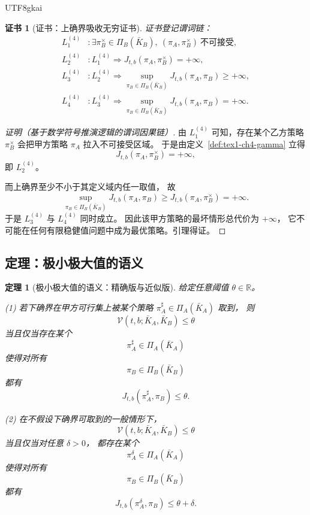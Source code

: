 \documentclass[12pt]{article}
\newtheorem{theorem}{定理}[section]
\newtheorem{Certificate}{证书}[section]
\newcommand{\RR}{\mathbb{R}}
\begin{document}
\begin{CJK*}{UTF8}{gkai}
\begin{Certificate}[证书：上确界吸收无穷证书]
\label{cert:tex1-ch4-infty-penalty}
证书登记谓词链：
\[
\begin{aligned}
  L^{(4)}_1 &: \exists \pi_B^\times\in\Pi_B(\bar K_B),\ (\pi_A,\pi_B^\times)\ \text{不可接受},\\
  L^{(4)}_2 &: L^{(4)}_1\Rightarrow J_{t,b}(\pi_A,\pi_B^\times)=+\infty,\\
  L^{(4)}_3 &: L^{(4)}_2\Rightarrow
              \sup_{\pi_B\in\Pi_B(\bar K_B)}J_{t,b}(\pi_A,\pi_B)\ge +\infty,\\
  L^{(4)}_4 &: L^{(4)}_3\Rightarrow
              \sup_{\pi_B\in\Pi_B(\bar K_B)}J_{t,b}(\pi_A,\pi_B)=+\infty.
\end{aligned}
\]
\end{Certificate}

\begin{proof}[证明（基于数学符号推演逻辑的谓词因果链）]
由 \(L^{(4)}_1\) 可知，存在某个乙方策略 \(\pi_B^\times\)
会把甲方策略 \(\pi_A\) 拉入不可接受区域。
于是由定义~\ref{def:tex1-ch4-gamma} 立得
\[
  J_{t,b}(\pi_A,\pi_B^\times)=+\infty,
\]
即 \(L^{(4)}_2\)。

而上确界至少不小于其定义域内任一取值，
故
\[
  \sup_{\pi_B\in\Pi_B(\bar K_B)}J_{t,b}(\pi_A,\pi_B)
  \ge
  J_{t,b}(\pi_A,\pi_B^\times)
  =
  +\infty.
\]
于是 \(L^{(4)}_3\) 与 \(L^{(4)}_4\) 同时成立。
因此该甲方策略的最坏情形总代价为 \(+\infty\)，
它不可能在任何有限稳健值问题中成为最优策略。引理得证。
\end{proof}

\subsection{定理：极小极大值的语义}
\label{subsec:tex1-ch4-theorem-semantics}

\begin{theorem}[极小极大值的语义：精确版与近似版]
\label{thm:tex1-ch4-semantics}
给定任意阈值 $\theta\in\RR$。

\textnormal{(1)} 若下确界在甲方可行集上被某个策略 $\pi_A^\sharp\in\Pi_A(\bar K_A)$ 取到，
则
\[
  \mathcal V(t,b;\bar K_A,\bar K_B)\le \theta
\]
当且仅当存在某个
\[
  \pi_A^\sharp\in\Pi_A(\bar K_A)
\]
使得对所有
\[
  \pi_B\in\Pi_B(\bar K_B)
\]
都有
\[
  J_{t,b}(\pi_A^\sharp,\pi_B)\le \theta.
\]

\textnormal{(2)} 在不假设下确界可取到的一般情形下，
\[
  \mathcal V(t,b;\bar K_A,\bar K_B)\le \theta
\]
当且仅当对任意 $\delta>0$，
都存在某个
\[
  \pi_A^\delta\in\Pi_A(\bar K_A)
\]
使得对所有
\[
  \pi_B\in\Pi_B(\bar K_B)
\]
都有
\[
  J_{t,b}(\pi_A^\delta,\pi_B)\le \theta+\delta.
\]
\end{theorem}


\end{CJK*}
\end{document}
